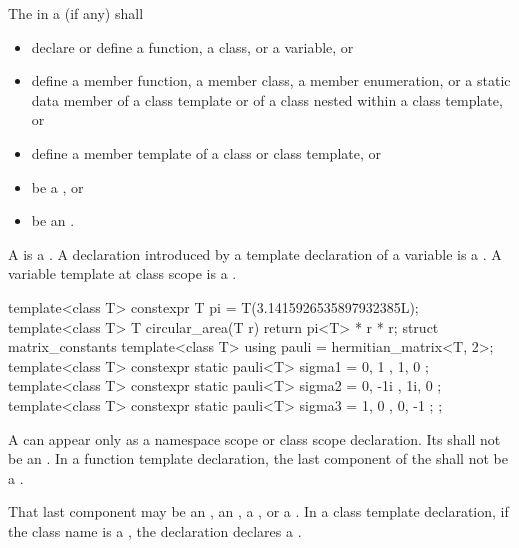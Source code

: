 \pnum
The
in a
(if any)
shall
\begin{itemize}
\item declare or define a function, a class, or a variable, or

\item define a member function, a member class, a member enumeration, or a static data member of a
class template or of a class nested within a class template, or

\item define a member template of a class or class template, or

\item be a , or

\item be an .
\end{itemize}

\pnum
A  is a .
A declaration introduced by a template declaration of a
%
variable is a . A variable template at class scope is a
.

\begin{example}
\begin{codeblock}
template<class T>
  constexpr T pi = T(3.1415926535897932385L);
template<class T>
  T circular_area(T r) {
    return pi<T> * r * r;
  }
struct matrix_constants {
  template<class T>
    using pauli = hermitian_matrix<T, 2>;
  template<class T>
    constexpr static pauli<T> sigma1 = { { 0, 1 }, { 1, 0 } };
  template<class T>
    constexpr static pauli<T> sigma2 = { { 0, -1i }, { 1i, 0 } };
  template<class T>
    constexpr static pauli<T> sigma3 = { { 1, 0 }, { 0, -1 } };
};
\end{codeblock}
\end{example}

\pnum
A
can appear only as a namespace scope or class scope declaration.
Its  shall not be an
.
In a function template declaration, the last component of the
shall not be a
.
\begin{note}
That last component may be an , an ,
a , or a . In
a class template declaration, if the
class name
is a
,
the declaration declares a .
\end{note}


